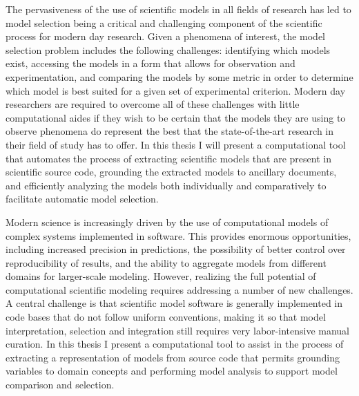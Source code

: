 The pervasiveness of the use of scientific models in all fields of research has led to model selection being a critical and challenging component of the scientific process for modern day research. Given a phenomena of interest, the model selection problem includes the following challenges: identifying which models exist, accessing the models in a form that allows for observation and experimentation, and comparing the models by some metric in order to determine which model is best suited for a given set of experimental criterion. Modern day researchers are required to overcome all of these challenges with little computational aides if they wish to be certain that the models they are using to observe phenomena do represent the best that the state-of-the-art research in their field of study has to offer. In this thesis I will present a computational tool that automates the process of extracting scientific models that are present in scientific source code, grounding the extracted models to ancillary documents, and efficiently analyzing the models both individually and comparatively to facilitate automatic model selection.

Modern science is increasingly driven by the use of computational models of complex systems implemented in software. This provides enormous opportunities, including increased precision in predictions, the possibility of better control over reproducibility of results, and the ability to aggregate models from different domains for larger-scale modeling. However, realizing the full potential of computational scientific modeling requires addressing a number of new challenges. A central challenge is that scientific model software is generally implemented in code bases that do not follow uniform conventions, making it so that model interpretation, selection and integration still requires very labor-intensive manual curation. In this thesis I present a computational tool to assist in the process of extracting a representation of models from source code that permits grounding variables to domain concepts and performing model analysis to support model comparison and selection.